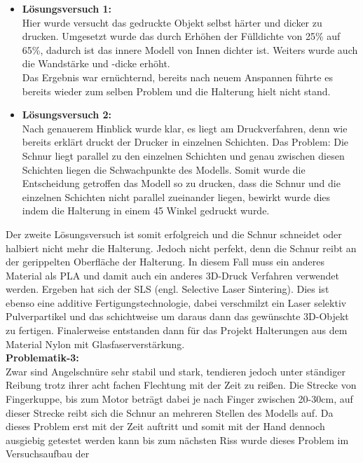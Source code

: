 \documentclass[titlepage,12pt,twoside]{article}
\begin{document}
\begin{itemize}
	\item \textbf{Lösungsversuch 1:} \\
	Hier wurde versucht das gedruckte Objekt selbst härter und dicker zu drucken. Umgesetzt wurde das durch Erhöhen der Fülldichte von 25\% auf 65\%, dadurch ist das innere Modell von Innen dichter ist. Weiters wurde auch die Wandstärke 
	und -dicke erhöht. \\
	Das Ergebnis war ernüchternd, bereits nach neuem Anspannen führte es bereits wieder zum selben Problem und die Halterung hielt nicht stand.
	\item \textbf{Lösungsversuch 2:} \\
	Nach genauerem Hinblick wurde klar, es liegt am Druckverfahren, denn wie bereits erklärt druckt der Drucker in einzelnen Schichten. Das Problem: Die Schnur liegt parallel zu den einzelnen Schichten und genau zwischen diesen Schichten 
	liegen die Schwachpunkte des Modells. Somit wurde die Entscheidung getroffen das Modell so zu drucken, dass die Schnur und die einzelnen Schichten nicht parallel zueinander liegen, bewirkt wurde dies indem die Halterung in einem 45\textdegree 
	Winkel gedruckt wurde.
\end{itemize}
\hfill \break
Der zweite Lösungsversuch ist somit erfolgreich und die Schnur schneidet oder halbiert nicht mehr die Halterung. Jedoch nicht perfekt, denn die Schnur reibt an der gerippelten Oberfläche der Halterung. In diesem Fall muss ein anderes Material als 
PLA und damit auch ein anderes 3D-Druck Verfahren verwendet werden. Ergeben hat sich der SLS (engl. Selective Laser Sintering). Dies ist ebenso eine additive Fertigungstechnologie, dabei verschmilzt ein Laser selektiv Pulverpartikel und das 
schichtweise um daraus dann das gewünschte 3D-Objekt zu fertigen. Finalerweise entstanden dann für das Projekt Halterungen aus dem Material Nylon mit Glasfaserverstärkung. %
\\
\textbf{Problematik-3:} \\
Zwar sind Angelschnüre sehr stabil und stark, tendieren jedoch unter ständiger Reibung trotz ihrer acht fachen Flechtung mit der Zeit zu reißen. Die Strecke von Fingerkuppe, bis zum Motor beträgt dabei je nach Finger zwischen 20-30cm, 
auf dieser Strecke reibt sich die Schnur an mehreren Stellen des Modells auf. Da dieses Problem erst mit der Zeit auftritt und somit mit der Hand dennoch ausgiebig getestet werden kann bis zum nächsten Riss wurde dieses Problem im Versuchsaufbau der 
\end{document}
